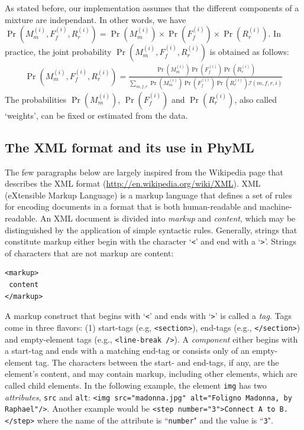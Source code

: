\documentclass[a4paper,12pt]{article}
\newcommand{\x}[1]{\texttt{#1}}
\begin{document}
As stated before, our implementation assumes that the different components of a mixture are
independant. In other words, we have $\Pr(M_m^{(i)},F_f^{(i)},R_r^{(i)}) = \Pr(M_m^{(i)}) \times
\Pr(F_f^{(i)}) \times \Pr(R_r^{(i)})$. In practice, the joint probability
$\Pr(M_m^{(i)},F_f^{(i)},R_r^{(i)})$ is obtained as follows:
\begin{eqnarray*}
\Pr(M_m^{(i)},F_f^{(i)},R_r^{(i)}) = \frac{\Pr(M_m^{(i)}) \Pr(F_f^{(i)}) \Pr(R_r^{(i)})}{
  \sum_{m,f,r} \Pr(M_m^{(i)}) \Pr(F_f^{(i)}) \Pr(R_r^{(i)}) \mathcal{I}(m,f,r,i)}
\label{equ:weights}
\end{eqnarray*}
The probabilities $\Pr(M_m^{(i)})$, $\Pr(F_f^{(i)})$ and $\Pr(R_r^{(i)})$, also called `weights', can be fixed or estimated
from the data.

\subsection{The XML format and its use in PhyML}\label{sec:XML format}

The few paragraphs below are largely inspired from  the Wikipedia page that describes the XML format
(\url{http://en.wikipedia.org/wiki/XML}). XML (eXtensible Markup Language) is a markup language that
defines  a set  of  rules  for encoding  documents  in  a format  that  is  both human-readable  and
machine-readable.  An  XML document is  divided into  {\em markup} and  {\em content}, which  may be
distinguished  by the  application of  simple syntactic  rules. Generally,  strings that  constitute
markup either begin  with the character `\x{<}' and  end with a `\x{>}'. Strings  of characters that
are not markup are content:

\vspace{0.2cm}
\begin{Verbatim}[frame=single, label=XML markup and content example, samepage=true,
  baselinestretch=0.5, fontsize=\small]
<markup>
 content
</markup>
\end{Verbatim}

A markup construct that begins  with `\x{<}' and ends with `\x{>}' is called  a {\em tag}. Tags come
in  three  flavors:  (1)  start-tags  (e.g,  \x{<section>}),  end-tags  (e.g.,  \x{</section>})  and
empty-element tags (e.g., \x{<line-break />}). A {\em  component} either begins with a start-tag and
ends with a  matching end-tag or consists only  of an empty-element tag. The  characters between the
start- and  end-tags, if any,  are the  element's content, and  may contain markup,  including other
elements, which are  called child elements.  In  the following example, the element  \x{img} has two
{\em  attributes},  \x{src}   and  \x{alt}:  \x{<img  src="madonna.jpg"   alt="Foligno  Madonna,  by
Raphael"/>}. Another example would be \x{<step number="3">Connect  A to B.</step>} where the name of
the attribute is ``\x{number}" and the value is ``\x{3}".
\end{document}
